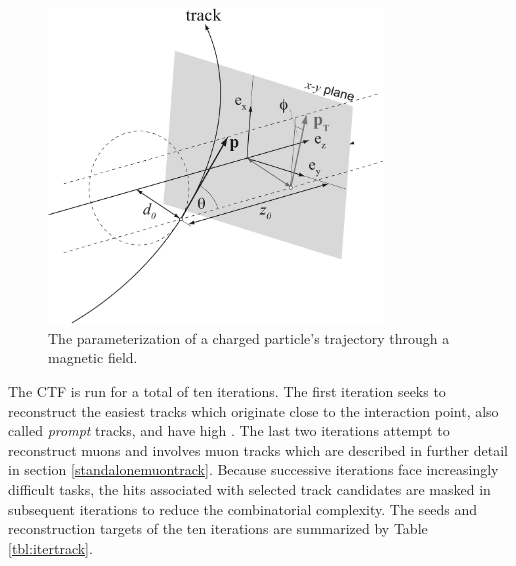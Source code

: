 \begin{figure}[htbp]
  \centering
    \includegraphics[width=3.5in]{images/track_parameters}
    \caption[Charged Particle Trajectory Parameterization]{The parameterization of a charged particle's trajectory through a magnetic field.\cite{salzburger}}
    \label{fig:track_params}
\end{figure}

The CTF is run for a total of ten iterations. The first iteration seeks to reconstruct the easiest tracks which originate close to the interaction point, also called \textit{prompt} tracks, and have high \pT. The last two iterations attempt to reconstruct muons and involves muon tracks which are described in further detail in section \ref{standalonemuontrack}. Because successive iterations face increasingly difficult tasks, the hits associated with selected track candidates are masked in subsequent iterations to reduce the combinatorial complexity. The seeds and reconstruction targets of the ten iterations are summarized by Table \ref{tbl:itertrack}.

